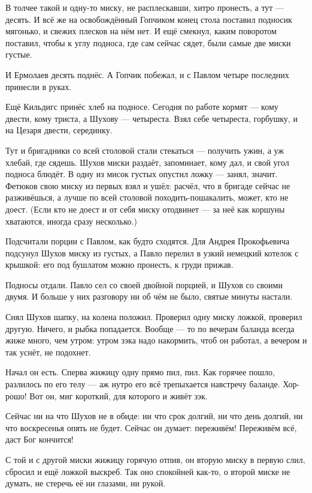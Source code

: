 В толчее такой и одну-то миску, не расплескавши, хитро пронесть, а тут --- десять. И всё же на 
освобождённый Гопчиком конец стола поставил подносик мягонько, и свежих плесков на нём нет. 
И ещё смекнул, каким поворотом поставил, чтобы к углу подноса, где сам сейчас сядет, были 
самые две миски густые.

И Ермолаев десять поднёс. А Гопчик побежал, и с Павлом четыре последних принесли в руках.

Ещё Кильдигс принёс хлеб на подносе. Сегодня по работе кормят --- кому двести, кому триста, а 
Шухову --- четыреста. Взял себе четыреста, горбушку, и на Цезаря двести, серединку.

Тут и бригадники со всей столовой стали стекаться --- получить ужин, а уж хлебай, где сядешь. 
Шухов миски раздаёт, запоминает, кому дал, и свой угол подноса блюдёт. В одну из мисок густых 
опустил ложку --- занял, значит. Фетюков свою миску из первых взял и ушёл: расчёл, что в бригаде 
сейчас не разживёшься, а лучше по всей столовой походить-пошакалить, может, кто не доест. 
(Если кто не доест и от себя миску отодвинет --- за неё как коршуны хватаются, иногда сразу 
несколько.)

Подсчитали порции с Павлом, как будто сходятся. Для Андрея Прокофьевича подсунул Шухов 
миску из густых, а Павло перелил в узкий немецкий котелок с крышкой: его под бушлатом можно 
пронесть, к груди прижав.

Подносы отдали. Павло сел со своей двойной порцией, и Шухов со своими двумя. И больше у них 
разговору ни об чём не было, святые минуты настали.

Снял Шухов шапку, на колена положил. Проверил одну миску ложкой, проверил другую. Ничего, и 
рыбка попадается. Вообще --- то по вечерам баланда всегда жиже много, чем утром: утром зэка 
надо накормить, чтоб он работал, а вечером и так уснёт, не подохнет.

Начал он есть. Сперва жижицу одну прямо пил, пил. Как горячее пошло, разлилось по его телу --- 
аж нутро его всё трепыхается навстречу баланде. Хор-рошо! Вот он, миг короткий, для которого и 
живёт зэк.

Сейчас ни на что Шухов не в обиде: ни что срок долгий, ни что день долгий, ни что воскресенья 
опять не будет. Сейчас он думает: переживём! Переживём всё, даст Бог кончится!

С той и с другой миски жижицу горячую отпив, он вторую миску в первую слил, сбросил и ещё 
ложкой выскреб. Так оно спокойней как-то, о второй миске не думать, не стеречь её ни глазами, 
ни рукой.

